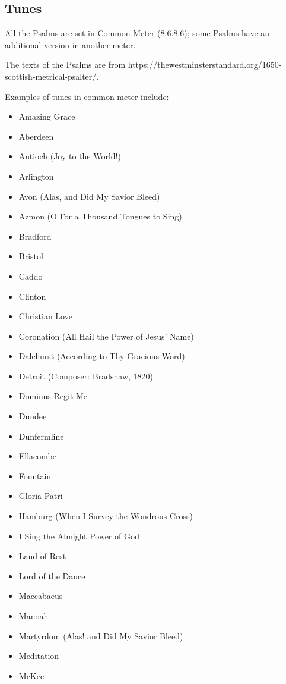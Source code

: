 \subsection*{Tunes}

All the Psalms are set in Common Meter (8.6.8.6); some Psalms have an additional version in another meter.

The texts of the Psalms are from https://thewestminsterstandard.org/1650-scottish-metrical-psalter/.

Examples of tunes in common meter include:


\begin{itemize}
\sc\item Amazing Grace
  \item Aberdeen
	\item Antioch (\textup{Joy to the World!}) 
	\item Arlington
	\item Avon (\textup{Alas, and Did My Savior Bleed})
	\item Azmon (\textup{O For a Thousand Tongues to Sing})
	\item Bradford
	\item Bristol
	\item Caddo
	\item Clinton
	\item Christian Love
	\item Coronation (\textup{All Hail the Power of Jesus' Name})
	\item Dalehurst (\textup{According to Thy Gracious Word})
	\item Detroit (Composer: Bradshaw, 1820)
	\item Dominus Regit Me
	\item Dundee
	\item Dunfermline
	\item Ellacombe
	\item Fountain
	\item Gloria Patri
	\item Hamburg (\textup{When I Survey the Wondrous Cross})
	\item I Sing the Almight Power of God
	\item Land of Rest
	\item Lord of the Dance
	\item Maccabaeus
	\item Manoah
	\item Martyrdom (\textup{Alas! and Did My Savior Bleed})
	\item Meditation
	\item McKee

\end{itemize}

